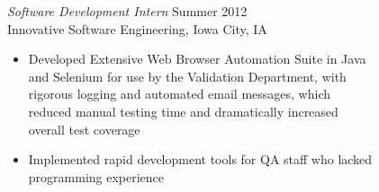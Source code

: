 \documentclass[line,margin]{res}
\begin{document}
\begin{resume}
            {\sl Software Development Intern} \hfill Summer 2012 \\
            Innovative Software Engineering, Iowa City, IA
                \begin{itemize} \itemsep -2pt %
                    \item Developed Extensive Web Browser Automation Suite in Java \\
                          and Selenium for use by the Validation Department, with \\
                          rigorous logging and automated email messages, which \\
                          reduced manual testing time and dramatically increased \\
                          overall test coverage
                    \item Implemented rapid development tools for QA staff who lacked \\ 
                          programming experience 
                \end{itemize}



\end{resume}
\end{document}
